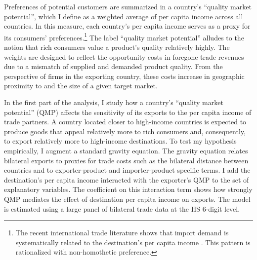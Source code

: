\documentclass[12pt,a4paper,oneside,times]{article}   	%
\begin{document}
Preferences of potential customers are summarized in a country's ``quality market potential'', which  I define as a  weighted average of per capita income  across all countries. In this measure, each country's per capita income serves as a proxy for its consumers' preferences.\footnote{The recent international trade literature shows that import demand is systematically related to the destination's per capita income \citep{Hallak2006,Hallak2010,Fajgelbaum2011,Markusen2013,Matsuyama2019}. This pattern is rationalized with non-homothetic preference.} The label ``quality  market potential'' alludes to the notion that rich consumers value a product's quality relatively highly. The weights are designed to reflect the opportunity costs in foregone trade revenues due to a mismatch of supplied and demanded product quality. From the perspective of firms in the exporting country, these costs increase in geographic proximity to and the size of a given target market. 

In the first part of the analysis, I study how a country's ``quality market potential'' (QMP) affects the sensitivity of its exports to the per capita income of trade partners.  A country located closer to high-income countries is expected to produce goods that appeal relatively more to rich consumers and, consequently, to export relatively more to high-income destinations. 
To test my hypothesis empirically, I augment a standard gravity equation. The gravity equation relates bilateral exports to proxies for trade costs such as the bilateral distance between countries and to exporter-product and importer-product specific terms. I add the destination's per capita income interacted with the exporter's QMP to the set of explanatory variables. The coefficient on this interaction term shows how strongly QMP mediates the effect of destination per capita income on exports. The model is estimated using a large panel of bilateral trade data at the HS 6-digit level.
\end{document}
